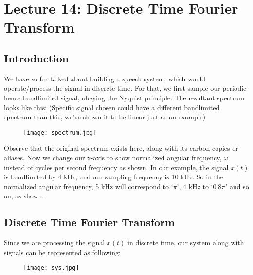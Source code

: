 \section{Lecture 14: Discrete Time Fourier Transform }






\subsection{Introduction}
We have so far talked about building a speech system, which would operate/process the signal in discrete time. For that, we first sample our periodic hence bandlimited signal, obeying the Nyquist principle. The resultant spectrum looks like this: (Specific signal chosen could have a different bandlimited spectrum than this, we've shown it to be linear just as an example)

\begin{figure}[htb]
\centering
\texttt{[image: spectrum.jpg]}
\caption{\label{fig:spectrum}}
\end{figure}

Observe that the original spectrum exists here, along with its carbon copies or aliases. Now we change our x-axis to show normalized angular frequency, $\omega$ instead of cycles per second frequency as shown. In our example, the signal $x(t)$ is bandlimited by 4 kHz, and our sampling frequency is 10 kHz. So in the normalized angular frequency, 5 kHz will correspond to `$\pi$', 4 kHz to `$0.8\pi$' and so on, as shown.

\subsection{Discrete Time Fourier Transform}
Since we are processing the signal $x(t)$ in discrete time, our system along with signals can be represented as following:

\begin{figure}[htb]
\centering
\texttt{[image: sys.jpg]}
\caption{\label{fig:fig6}}
\end{figure}

